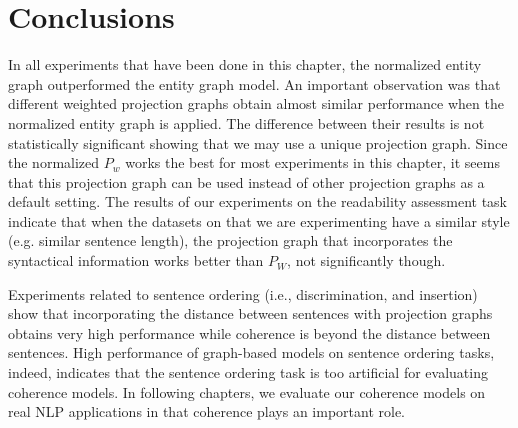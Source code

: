 \section{Conclusions}
%
In all experiments that have been done in this chapter, the normalized entity graph outperformed the entity graph model. 
An important observation was that different weighted projection graphs obtain almost similar performance when the normalized entity graph is applied. 
The difference between their results is not statistically significant showing that we may use a unique projection graph. 
Since the normalized $P_w$ works the best for most experiments in this chapter, it seems that this projection graph can be used instead of other projection graphs as a default setting. 
The results of our experiments on the readability assessment task indicate that when the datasets on that we are experimenting have a similar style (e.g. similar sentence length), the projection graph that incorporates the syntactical information works better than $P_W$, not significantly though. 

Experiments related to sentence ordering (i.e., discrimination, and insertion) show that  incorporating the distance between sentences with projection graphs obtains very high performance while coherence is beyond the distance between sentences. 
High performance of graph-based models on sentence ordering tasks, indeed, indicates that the sentence ordering task is too artificial for evaluating coherence models. 
In following chapters, we evaluate our coherence models on real NLP applications in that coherence plays an important role. 


